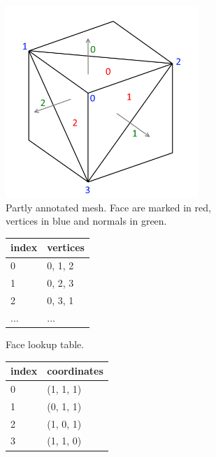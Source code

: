 \documentclass[../ClassicThesis.tex]{subfiles}
\begin{document}
\begin{figure}
  \centering
  \begin{subfigure}[t]{0.8\textwidth}
    \centering
    \includegraphics[width=0.8\textwidth]{Images/facevertexmesh.png}
    \caption{Partly annotated mesh. Face are marked in red, vertices in blue and normals in green.}
    \vspace{.5cm}
  \end{subfigure}
  \begin{subfigure}[t]{0.32\textwidth}
    \centering
    \begin{tabular}{ | l | l | }
      \hline
      index & vertices \\ \hline
      0 & 0, 1, 2 \\ \hline
      1 & 0, 2, 3 \\ \hline
      2 & 0, 3, 1 \\ \hline
      ... & ... \\
      \hline
    \end{tabular}
    \caption{Face lookup table.}
  \end{subfigure}
  \begin{subfigure}[t]{0.32\textwidth}
    \centering
    \begin{tabular}{ | l | l | }
      \hline
      index & coordinates \\ \hline
      0 & (1, 1, 1) \\ \hline
      1 & (0, 1, 1) \\ \hline
      2 & (1, 0, 1) \\ \hline
      3 & (1, 1, 0) \\ \hline

\end{tabular}
\end{subfigure}
\end{figure}
\end{document}
